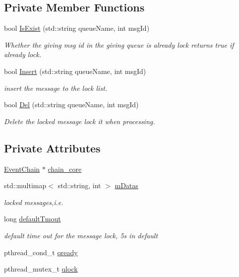 \subsection*{\-Private \-Member \-Functions}
\begin{DoxyCompactItemize}
\item 
bool \hyperlink{classMsgLock_ae10ea239514a1e25b04e1cbff387f60b}{\-Is\-Exist} (std\-::string queue\-Name, int msg\-Id)
\begin{DoxyCompactList}\small\item\em \-Whether the giving msg id in the giving queue is already lock returns true if already lock. \end{DoxyCompactList}\item 
bool \hyperlink{classMsgLock_a641f1a5b90f5eb59f3139eb4a311267a}{\-Insert} (std\-::string queue\-Name, int msg\-Id)
\begin{DoxyCompactList}\small\item\em insert the message to the lock list. \end{DoxyCompactList}\item 
bool \hyperlink{classMsgLock_a309cdb87539f105fe41ed0130fa21f5b}{\-Del} (std\-::string queue\-Name, int msg\-Id)
\begin{DoxyCompactList}\small\item\em \-Delete the locked message lock it when processing. \end{DoxyCompactList}\end{DoxyCompactItemize}
\subsection*{\-Private \-Attributes}
\begin{DoxyCompactItemize}
\item 
\hyperlink{classEventChain}{\-Event\-Chain} $\ast$ \hyperlink{classMsgLock_a31f44a96cdf2cef27b8543f530231631}{chain\-\_\-core}
\item 
std\-::multimap$<$ std\-::string, int $>$ \hyperlink{classMsgLock_a15c1b0e57d86b2598e5b57b43094c4c6}{m\-Datas}
\begin{DoxyCompactList}\small\item\em locked messages,i.\-e. \end{DoxyCompactList}\item 
long \hyperlink{classMsgLock_a39cad315b694113c3aa552ba84db9093}{default\-Tmout}
\begin{DoxyCompactList}\small\item\em default time out for the message lock, 5s in default \end{DoxyCompactList}\item 
pthread\-\_\-cond\-\_\-t \hyperlink{classMsgLock_a94499ef81482492775a556e26ff6fe3f}{qready}
\item 
pthread\-\_\-mutex\-\_\-t \hyperlink{classMsgLock_a8d00c3f7af52fef41cc98c661e1df541}{qlock}
\end{DoxyCompactItemize}
